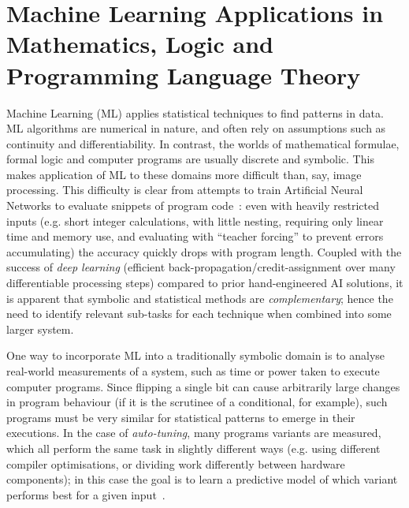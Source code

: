 \section{Machine Learning Applications in Mathematics, Logic and Programming
  Language Theory}

Machine Learning (ML) applies statistical techniques to find patterns in data.
ML algorithms are numerical in nature, and often rely on assumptions such as
continuity and differentiability. In contrast, the worlds of mathematical
formulae, formal logic and computer programs are usually discrete and symbolic.
This makes application of ML to these domains more difficult than, say, image
processing. This difficulty is clear from attempts to train Artificial Neural
Networks to evaluate snippets of program code~\cite{zaremba2014learning}: even
with heavily restricted inputs (e.g. short integer calculations, with little
nesting, requiring only linear time and memory use, and evaluating with
``teacher forcing'' to prevent errors accumulating) the accuracy quickly drops
with program length. Coupled with the success of \emph{deep learning} (efficient
back-propagation/credit-assignment over many differentiable processing steps)
compared to prior hand-engineered AI solutions, it is apparent that symbolic
and statistical methods are \emph{complementary}; hence the need to identify
relevant sub-tasks for each technique when combined into some larger system.

One way to incorporate ML into a traditionally symbolic domain is to analyse
real-world measurements of a system, such as time or power taken to execute
computer programs. Since flipping a single bit can cause arbitrarily large
changes in program behaviour (if it is the scrutinee of a conditional, for
example), such programs must be very similar for statistical patterns to emerge
in their executions. In the case of \emph{auto-tuning}, many programs variants
are measured, which all perform the same task in slightly different ways (e.g.
using different compiler optimisations, or dividing work differently between
hardware components); in this case the goal is to learn a predictive model of
which variant performs best for a given input~\cite{ganapathi2009case}.

